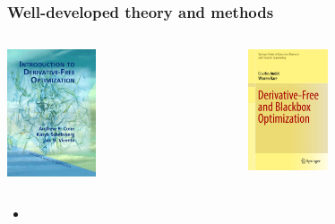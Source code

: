 \documentclass[slidestop,mathserif,xcolor=dvipsnames]{beamer}
\begin{document}


\begin{frame}
  \frametitle{Well-developed theory and methods}
  \vspace{-3ex}
  \begin{columns}[T]
      \begin{column}{0.4\textwidth}
          \begin{center}
          \includegraphics[width=0.4\textwidth]{idfo-cover.jpg}
          \end{center}
      \end{column}
      \begin{column}{0.4\textwidth}
          \begin{center}
         \includegraphics[width=0.38\textwidth]{dfbo-cover.jpeg}
          \end{center}
      \end{column}
  \end{columns}
\vspace{1ex}
  \begin{itemize}
    \item

\end{itemize}
\end{frame}
\end{document}
